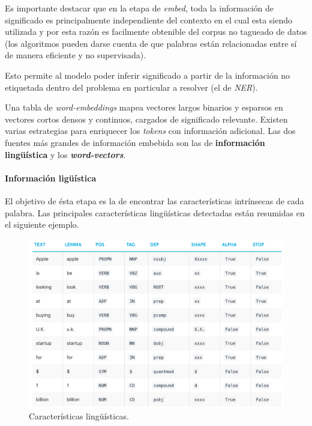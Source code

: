 \documentclass[12pt,a4paper,]{scrartcl}
\let\oldparagraph\paragraph
\renewcommand{\paragraph}[1]{\oldparagraph{#1}\mbox{}}
\begin{document}
Es importante destacar que en la etapa de \emph{embed}, toda la información de significado es principalmente independiente del contexto en el cual esta siendo utilizada y por esta razón es facilmente obtenible del corpus no tagueado de datos (los algoritmos pueden darse cuenta de que palabras están relacionadas entre sí de manera eficiente y no supervisada).

Esto permite al modelo poder inferir significado a partir de la información no etiquetada dentro del problema en particular a resolver (el de \emph{NER}).

Una tabla de \emph{word-embeddings} mapea vectores largos binarios y esparsos en vectores cortos densos y continuos, cargados de significado relevante. Existen varias estrategias para enriquecer los \emph{tokens} con información adicional. Las dos fuentes más grandes de información embebida son las de \textbf{información lingüística} y los \textbf{\emph{word-vectors}}.

\hypertarget{informaciuxf3n-liguxfcuxedstica}{%
\paragraph{Información ligüística}\label{informaciuxf3n-liguxfcuxedstica}}

El objetivo de ésta etapa es la de encontrar las características intrínsecas de cada palabra. Las principales características lingüísticas detectadas están resumidas en el siguiente ejemplo.

\begin{figure}[H]

{\centering \includegraphics{assets/pos.pdf} 

}

\caption{Características lingüísticas.}\label{fig:formula-pos}
\end{figure}
\end{document}
